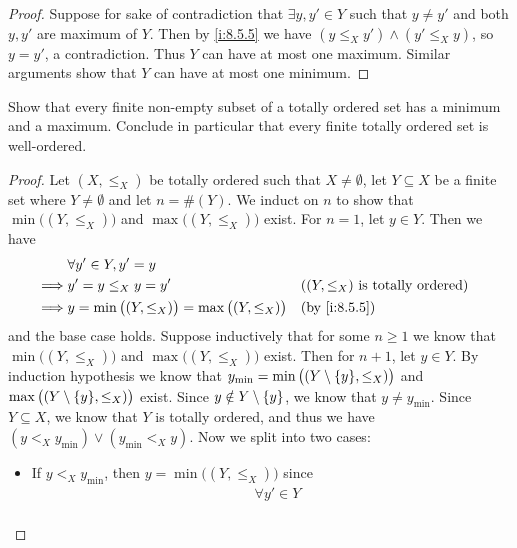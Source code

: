 \begin{proof}
  Suppose for sake of contradiction that \(\exists y, y' \in Y\) such that \(y \neq y'\) and both \(y, y'\) are maximum of \(Y\).
  Then by \cref{i:8.5.5} we have \((y \leq_X y') \land (y' \leq_X y)\), so \(y = y'\), a contradiction.
  Thus \(Y\) can have at most one maximum.
  Similar arguments show that \(Y\) can have at most one minimum.
\end{proof}

\begin{ex}\label{i:ex:8.5.8}
  Show that every finite non-empty subset of a totally ordered set has a minimum and a maximum.
  Conclude in particular that every finite totally ordered set is well-ordered.
\end{ex}

\begin{proof}
  Let \((X, \leq_X)\) be totally ordered such that \(X \neq \emptyset\), let \(Y \subseteq X\) be a finite set where \(Y \neq \emptyset\) and let \(n = \#(Y)\).
  We induct on \(n\) to show that \(\min\big((Y, \leq_X)\big)\) and \(\max\big((Y, \leq_X)\big)\) exist.
  For \(n = 1\), let \(y \in Y\).
  Then we have
  \begin{align*}
             & \forall y' \in Y, y' = y                                                                                   \\
    \implies & y' = y \leq_X y = y'                                      &  & \text{(\((Y, \leq_X)\) is totally ordered)} \\
    \implies & y = \min\big((Y, \leq_X)\big) = \max\big((Y, \leq_X)\big) &  & \by{i:8.5.5}
  \end{align*}
  and the base case holds.
  Suppose inductively that for some \(n \geq 1\) we know that \(\min\big((Y, \leq_X)\big)\) and \(\max\big((Y, \leq_X)\big)\) exist.
  Then for \(n + 1\), let \(y \in Y\).
  By induction hypothesis we know that \(y_{\min} = \min\big((Y \setminus \set{y}, \leq_X)\big)\) and \(\max\big((Y \setminus \set{y}, \leq_X)\big)\) exist.
  Since \(y \notin Y \setminus \left\lbrace y\right\rbrace\), we know that \(y \neq y_{\min}\).
  Since \(Y \subseteq X\), we know that \(Y\) is totally ordered, and thus we have \((y <_X y_{\min}) \lor (y_{\min} <_X y)\).
  Now we split into two cases:
  \begin{itemize}
    \item If \(y <_X y_{\min}\), then \(y = \min\big((Y, \leq_X)\big)\) since
          \begin{align*}
                     & \forall y' \in Y                                                                       \\

\end{align*}
\end{itemize}
\end{proof}
